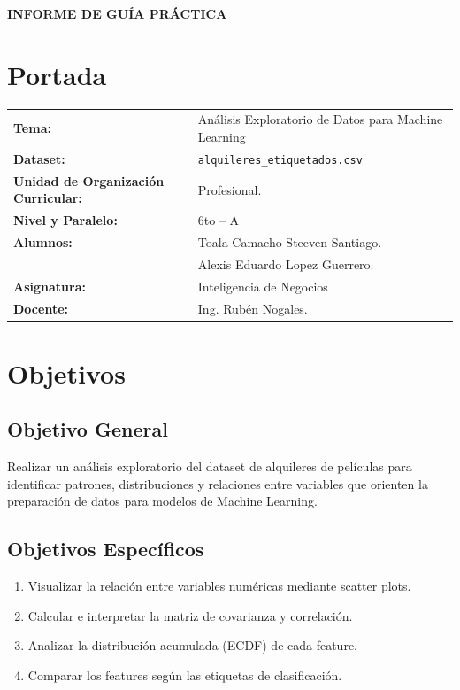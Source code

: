 \documentclass[12pt,a4paper]{article}
\begin{document}
\begin{center}{\large\textbf{INFORME DE GU\'IA PR\'ACTICA}}\end{center}
\section{Portada}
\begin{flushleft}\renewcommand{\arraystretch}{1.3}
\begin{tabular}{@{} l p{10cm} @{}}
  \textbf{Tema:} & An\'alisis Exploratorio de Datos para Machine Learning \\
  \textbf{Dataset:} & \texttt{alquileres\_etiquetados.csv} \\
  \textbf{Unidad de Organizaci\'on Curricular:} & Profesional. \\
  \textbf{Nivel y Paralelo:} & 6to -- A \\
  \textbf{Alumnos:} & Toala Camacho Steeven Santiago. \\ & Alexis Eduardo Lopez Guerrero. \\
  \textbf{Asignatura:} & Inteligencia de Negocios \\
  \textbf{Docente:} & Ing. Rub\'en Nogales. \\
\end{tabular}\end{flushleft}
\section{Objetivos}
\subsection*{Objetivo General}
Realizar un an\'alisis exploratorio del dataset de alquileres de pel\'iculas
para identificar patrones, distribuciones y relaciones entre variables
que orienten la preparaci\'on de datos para modelos de Machine Learning.
\subsection*{Objetivos Espec\'ificos}
\begin{enumerate}[label=\arabic*.]
  \item Visualizar la relaci\'on entre variables num\'ericas mediante scatter plots.
  \item Calcular e interpretar la matriz de covarianza y correlaci\'on.
  \item Analizar la distribuci\'on acumulada (ECDF) de cada feature.
  \item Comparar los features seg\'un las etiquetas de clasificaci\'on.
\end{enumerate}
\end{document}
